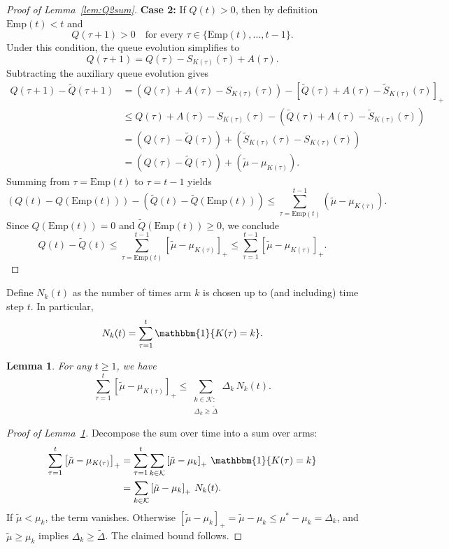 \documentclass[12pt,draftcls, onecolumn]{IEEEtran}
\newtheorem{lemma}{Lemma}
\begin{document}
{\begin{proof}[Proof of Lemma~\ref{lem:Q2sum}]
\textbf{Case 2:} If \(Q(t)>0\), then by definition \(\mathrm{Emp}(t) < t\) and
\[
Q(\tau+1) > 0 \quad \text{for every } \tau\in\{\mathrm{Emp}(t),\ldots,t-1\}.
\]
Under this condition, the queue evolution
simplifies to
\[
Q(\tau+1) = Q(\tau) - S_{K(\tau)}(\tau) + A(\tau).
\]
Subtracting the auxiliary queue evolution gives
\begin{align*}
Q(\tau+1)-\widetilde{Q}(\tau+1)
&=\left(Q(\tau)+A(\tau)-S_{K(\tau)}(\tau)\right) - \left[\widetilde{Q}(\tau)+A(\tau)-\widetilde{S}_{K(\tau)}(\tau)\right]_+\\[1mm]
&\le Q(\tau)+A(\tau)-S_{K(\tau)}(\tau) - \left(\widetilde{Q}(\tau)+A(\tau)-\widetilde{S}_{K(\tau)}(\tau)\right)\\[1mm]
&=\left(Q(\tau)-\widetilde{Q}(\tau)\right) + \left(\widetilde{S}_{K(\tau)}(\tau)-S_{K(\tau)}(\tau)\right)\\[1mm]
&=\left(Q(\tau)-\widetilde{Q}(\tau)\right) + \left(\widetilde{\mu}-\mu_{K(\tau)}\right).
\end{align*}
Summing from \(\tau=\mathrm{Emp}(t)\) to \(\tau=t-1\) yields
\[
\left(Q(t)-Q(\mathrm{Emp}(t))\right)-\left(\widetilde{Q}(t)-\widetilde{Q}(\mathrm{Emp}(t))\right)
\le \sum_{\tau=\mathrm{Emp}(t)}^{t-1}\left(\widetilde{\mu}-\mu_{K(\tau)}\right).
\]
Since \(Q(\mathrm{Emp}(t))=0\) and \(\widetilde{Q}(\mathrm{Emp}(t))\ge0\), we conclude
\[
Q(t)-\widetilde{Q}(t)
\le \sum_{\tau=\mathrm{Emp}(t)}^{t-1}\left[\widetilde{\mu}-\mu_{K(\tau)}\right]_+
\le \sum_{\tau=1}^{t-1}\left[\widetilde{\mu}-\mu_{K(\tau)}\right]_+.
\]
\end{proof}
Define $N_k(t)$ as the number of times arm $k$ is chosen up to (and including) time step $t$. In particular,
\begin{align}\label{eqn:n_k_t_known}
    N_k(t) = \sum_{\tau = 1}^t \mathbbm{1}\{K(\tau) = k\}.
\end{align}


\begin{lemma}\label{lem:sum2Delta}
For any  \(t\ge 1\), we have
\[
\sum_{\tau=1}^t \left[ \tilde{\mu} - \mu_{K(\tau)}  \right]_+ 
\le
\sum_{\substack{k\in\mathcal{K}:\\ \Delta_k \ge \tilde{\Delta}}} \Delta_k\, N_k(t).
\]
\end{lemma}
\begin{proof}[Proof of Lemma~\ref{lem:sum2Delta}]
Decompose the sum over time into a sum over arms:
\begin{align*}
\sum_{\tau=1}^t \left[ \tilde{\mu} - \mu_{K(\tau)}  \right]_+ 
&=\sum_{\tau=1}^t \sum_{k\in\mathcal{K}} \left[\tilde{\mu} - \mu_k \right]_+ \, \mathbbm{1}\{K(\tau)=k\} \\
&=\sum_{k\in\mathcal{K}} \left[ \tilde{\mu} - \mu_k \right]_+ \, N_k(t).
\end{align*}
If \(\widetilde{\mu}<\mu_k\), the term vanishes.  Otherwise \([\widetilde{\mu}-\mu_k]_+ = \widetilde{\mu}-\mu_k \le \mu^*-\mu_k=\Delta_k\), and \(\widetilde{\mu}\ge\mu_k\) implies \(\Delta_k\ge\tilde\Delta\).  The claimed bound follows.
\end{proof}


}
\end{document}
